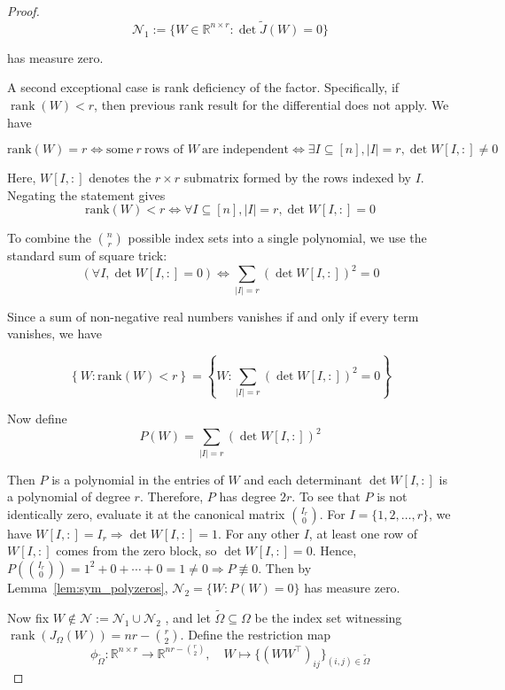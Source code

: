 \documentclass{article}
\begin{document}
\begin{proof}
\[
\mathcal{N}_1 := \{ W \in \mathbb{R}^{n \times r} : \det \widetilde{J}(W) = 0 \}
\]

has measure zero. 

A second exceptional case is rank deficiency of the factor. Specifically, if $\operatorname{rank}(W) < r$, then previous rank result for the differential does not apply. We have

\[
\text{rank}(W) = r \iff \text{some} \ r \ \text{rows of } W \ \text{are independent} \iff \exists I \subseteq [n], \vert I \vert = r, \det W[I, :] \neq 0
\]

Here, $W[I,:]$ denotes the $r \times r$ submatrix formed by the rows indexed by $I$. Negating the statement gives
\[
\text{rank}(W) < r \iff \forall I \subseteq [n], \vert I \vert = r, \det W[I, :] = 0
\]

To combine the $\binom{n}{r}$ possible index sets into a single polynomial, we use the standard sum of square trick:
\[
(\forall I, \det W[I, :] = 0) \iff \sum_{\vert I \vert = r} \left( \det W[I,:] \right)^2 = 0
\]

Since a sum of non-negative real numbers vanishes if and only if every term vanishes, we have

\[
\left\{ W : \text{rank}(W) < r \right\} = \left\{ W : \sum_{\vert I \vert = r} \left( \det W[I, :] \right)^2 = 0\right\}
\]

Now define 
\[ 
P(W) = \sum_{\vert I \vert = r} \left( \det W[I, :] \right)^2 
\]

Then $P$ is a polynomial in the entries of $W$ and each determinant $\det W[I,:]$ is a polynomial of degree $r$. Therefore, $P$ has degree $2r$. To see that $P$ is not identically zero, evaluate it at the canonical matrix $\binom{I_r}{0}$. For $I = \{ 1, 2, \ldots, r\}$, we have $W[ I, :] = I_r \Rightarrow \det W [I, :] = 1$. For any other $I$, at least one row of $W[I, :]$ comes from the zero block, so $\det W[I,:] = 0$. Hence, $P\left(\binom{I_r}{0}\right) = 1^2 + 0 + \cdots + 0 = 1 \neq 0 \Rightarrow P \not\equiv 0$. Then by Lemma~\ref{lem:sym_polyzeros}, $\mathcal{N}_2 = \{W: P(W) = 0 \}$ has measure zero.

Now fix $W \not\in \mathcal{N} := \mathcal{N}_1 \cup \mathcal{N}_2$ , and let $\widetilde{\Omega} \subseteq \Omega$ be the index set witnessing $\operatorname{rank}(J_{\Omega}(W)) = nr - \binom{r}{2}$. Define the restriction map
\[ 
\phi_{\widetilde{\Omega}} : \mathbb{R}^{n \times r} \to \mathbb{R}^{nr - \binom{r}{2}}, \quad W \mapsto \{(WW^{\top})_{ij}\}_{(i,j) \in \widetilde{\Omega}} 
\]


\end{proof}
\end{document}
